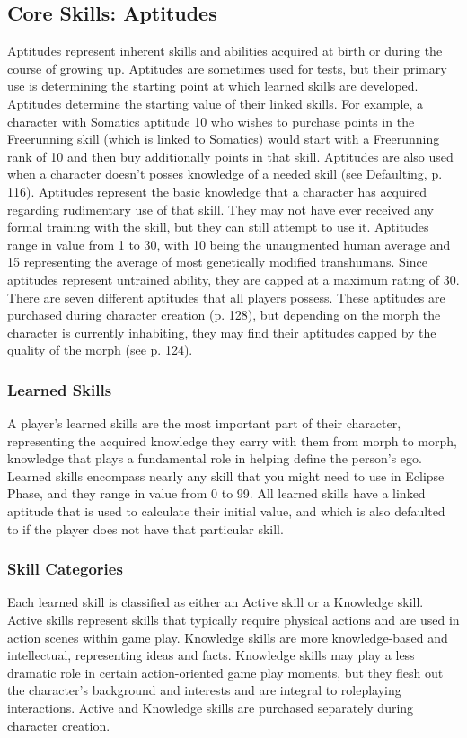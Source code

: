 \subsection{Core Skills: Aptitudes}
Aptitudes represent inherent skills and abilities acquired
at birth or during the course of growing up. Aptitudes
are sometimes used for tests, but their primary use is
determining the starting point at which learned skills
are developed. Aptitudes determine the starting value
of their linked skills. For example, a character with
Somatics aptitude 10 who wishes to purchase points
in the Freerunning skill (which is linked to Somatics)
would start with a Freerunning rank of 10 and then
buy additionally points in that skill.
Aptitudes are also used when a character doesn’t
posses knowledge of a needed skill (see Defaulting, p.
116). Aptitudes represent the basic knowledge that a
character has acquired regarding rudimentary use of that
skill. They may not have ever received any formal training
with the skill, but they can still attempt to use it.
Aptitudes range in value from 1 to 30, with 10 being
the unaugmented human average and 15 representing
the average of most genetically modified transhumans.
Since aptitudes represent untrained ability, they are
capped at a maximum rating of 30.
There are seven different aptitudes that all players
possess. These aptitudes are purchased during character
creation (p. 128), but depending on the morph the
character is currently inhabiting, they may find their aptitudes
capped by the quality of the morph (see p. 124).

\subsubsection{Learned Skills}
A player’s learned skills are the most important part of
their character, representing the acquired knowledge
they carry with them from morph to morph, knowledge
that plays a fundamental role in helping define
the person’s ego. Learned skills encompass nearly any
skill that you might need to use in Eclipse Phase, and
they range in value from 0 to 99.
All learned skills have a linked aptitude that is
used to calculate their initial value, and which is
also defaulted to if the player does not have that
particular skill.


 \subsubsection{Skill Categories}
Each learned skill is classified as either an Active skill
or a Knowledge skill. Active skills represent skills
that typically require physical actions and are used in
action scenes within game play. Knowledge skills are
more knowledge-based and intellectual, representing
ideas and facts. Knowledge skills may play a less dramatic role in certain action-oriented game play moments, but they flesh out the character’s background
and interests and are integral to roleplaying interactions. Active and Knowledge skills are purchased
separately during character creation.


